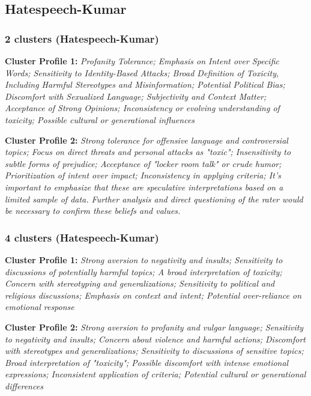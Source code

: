 \documentclass[11pt]{article}
\newcommand{\profiletext}[1]{\textit{#1}}
\begin{document}
\subsection{Hatespeech-Kumar}

\subsubsection{2 clusters (Hatespeech-Kumar)}

\textbf{Cluster Profile 1:} \profiletext{Profanity Tolerance; Emphasis on Intent over Specific Words; Sensitivity to Identity-Based Attacks; Broad Definition of Toxicity, Including Harmful Stereotypes and Misinformation; Potential Political Bias; Discomfort with Sexualized Language; Subjectivity and Context Matter; Acceptance of Strong Opinions; Inconsistency or evolving understanding of toxicity; Possible cultural or generational influences}

\textbf{Cluster Profile 2:} \profiletext{Strong tolerance for offensive language and controversial topics; Focus on direct threats and personal attacks as "toxic"; Insensitivity to subtle forms of prejudice; Acceptance of "locker room talk" or crude humor; Prioritization of intent over impact; Inconsistency in applying criteria; It's important to emphasize that these are speculative interpretations based on a limited sample of data.  Further analysis and direct questioning of the rater would be necessary to confirm these beliefs and values.}

\subsubsection{4 clusters (Hatespeech-Kumar)}

\textbf{Cluster Profile 1:} \profiletext{Strong aversion to negativity and insults; Sensitivity to discussions of potentially harmful topics; A broad interpretation of toxicity; Concern with stereotyping and generalizations; Sensitivity to political and religious discussions; Emphasis on context and intent; Potential over-reliance on emotional response}

\textbf{Cluster Profile 2:} \profiletext{Strong aversion to profanity and vulgar language; Sensitivity to negativity and insults; Concern about violence and harmful actions; Discomfort with stereotypes and generalizations; Sensitivity to discussions of sensitive topics; Broad interpretation of "toxicity"; Possible discomfort with intense emotional expressions; Inconsistent application of criteria; Potential cultural or generational differences}
\end{document}
